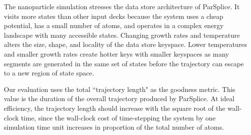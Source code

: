 The nanoparticle simulation stresses the data store architecture of ParSplice.
It visits more states than other input decks because the system uses a cheap
potential, has a small number of atoms, and operates in a complex energy
landscape with many accessible states. Changing growth rates and temperature
alters the size, shape, and locality of the data store keyspace. Lower
temperatures and smaller growth rates create hotter keys with smaller keyspaces
as many segments are generated in the same set of states before the trajectory
can escape to a new region of state space.

Our evaluation uses the total ``trajectory length" as the goodness metric. This
value is the duration of the overall trajectory produced by ParSplice. At
ideal efficiency, the trajectory length should increase with the square root of
the wall-clock time, since the wall-clock cost of time-stepping the system by
one simulation time unit increases in proportion of the total number of atoms.
